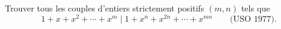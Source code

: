 Trouver tous les couples d'entiers strictement positifs $(m, n)$ tels que
\[ 1 + x + x^2 + \cdots + x^m \mid 1 + x^n + x^{2n} + \cdots + x^{mn} \qquad \text{(USO 1977).} \]
